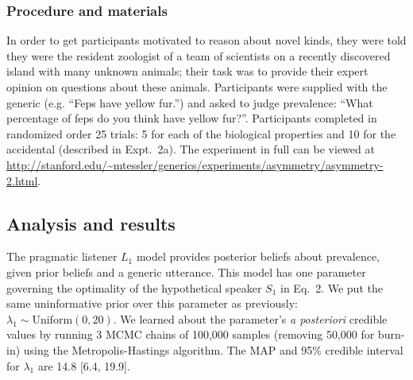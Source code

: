 \documentclass[12pt,letterpaper]{article}
\begin{document}
\subsubsection*{Procedure and materials}

In order to get participants motivated to reason about novel kinds, they were told they were the resident zoologist of a team of scientists on a recently discovered island with many unknown animals; their task was to provide their expert opinion on questions about these animals.
Participants were supplied with the generic (e.g. ``Feps have yellow fur.'') and asked to judge prevalence: ``What percentage of feps do you think have yellow fur?''. 
Participants completed in randomized order 25 trials: 5 for each of the biological properties and 10 for the accidental (described in Expt.~2a).
The experiment in full can be viewed at \url{http://stanford.edu/~mtessler/generics/experiments/asymmetry/asymmetry-2.html}. 

\subsection*{Analysis and results}

The pragmatic listener $L_1$ model provides posterior beliefs about prevalence, given prior beliefs and a generic utterance.
This model has one parameter governing the optimality of the hypothetical speaker $S_1$ in Eq.~2. 
We put the same uninformative prior over this parameter as previously: $\lambda_1 \sim \text{Uniform}(0, 20)$.
We learned about the parameter's \emph{a posteriori} credible values by running 3 MCMC chains of 100,000 samples (removing 50,000 for burn-in) using the Metropolis-Hastings algorithm.
The MAP and 95\% credible interval for $\lambda_1$ are 14.8 [6.4, 19.9].
\end{document}
